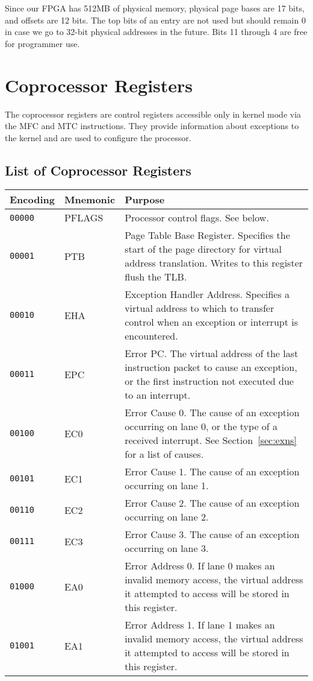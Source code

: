 \documentclass[11pt,openany]{report}
\begin{document}
Since our FPGA has 512MB of physical memory, physical page bases are 17 bits, and offsets are 12 bits. The top bits of an entry are not used but should remain 0 in case we go to 32-bit physical addresses in the future. Bits 11 through 4 are free for programmer use.

\section{Coprocessor Registers}
\label{sec:cpregs}

The coprocessor registers are control registers accessible only in kernel mode via the MFC and MTC instructions. They provide information about exceptions to the kernel and are used to configure the processor. 

\subsection{List of Coprocessor Registers}

\begin{table}[!h]
\centering
\begin{tabularx}{\textwidth}{l|l|X}
Encoding & Mnemonic & Purpose\\
\hline
\texttt{00000} & PFLAGS & Processor control flags. See below.\\
\texttt{00001} & PTB & Page Table Base Register. Specifies the start of the page directory for virtual address translation. Writes to this register flush the TLB.\\
\texttt{00010} & EHA & Exception Handler Address. Specifies a virtual address to which to transfer control when an exception or interrupt is encountered.\\
\texttt{00011} & EPC & Error PC. The virtual address of the last instruction packet to cause an exception, or the first instruction not executed due to an interrupt.\\
\texttt{00100} & EC0 & Error Cause 0. The cause of an exception occurring on lane 0, or the type of a received interrupt. See Section~\ref{sec:exns} for a list of causes.\\
\texttt{00101} & EC1 & Error Cause 1. The cause of an exception occurring on lane 1.\\
\texttt{00110} & EC2 & Error Cause 2. The cause of an exception occurring on lane 2.\\
\texttt{00111} & EC3 & Error Cause 3. The cause of an exception occurring on lane 3.\\
\texttt{01000} & EA0 & Error Address 0. If lane 0 makes an invalid memory access, the virtual address it attempted to access will be stored in this register.\\
\texttt{01001} & EA1 & Error Address 1. If lane 1 makes an invalid memory access, the virtual address it attempted to access will be stored in this register.
\end{tabularx}
\end{table}
\end{document}
